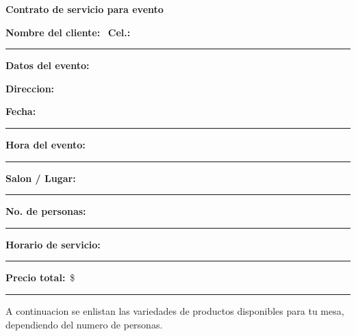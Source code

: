 \documentclass[letterpaper,11pt]{article}
\newcommand{\linefield}[1]{\textbf{#1}\ \hrulefill}
\begin{document}
\begin{center}
    {\Large \textbf{Contrato de servicio para evento}}
\end{center}

\vspace{0.4cm}

\linefield{Nombre del cliente:}\hspace{0.5cm}
\textbf{Cel.:}\ \rule{4cm}{0.4pt}

\vspace{0.3cm}

\linefield{Datos del evento:}

\vspace{0.3cm}

\linefield{Direccion:}

\vspace{0.3cm}

\textbf{Fecha:}\ \rule{4.6cm}{0.4pt}
\hspace{0.5cm}
\textbf{Hora del evento:}\ \rule{4.4cm}{0.4pt}

\vspace{0.3cm}

\textbf{Salon / Lugar:}\ \rule{10.8cm}{0.4pt}

\vspace{0.3cm}

\textbf{No. de personas:}\ \rule{4.2cm}{0.4pt}
\hspace{0.4cm}
\textbf{Horario de servicio:}\ \rule{4cm}{0.4pt}

\vspace{0.3cm}

\textbf{Precio total:}\ \$\rule{4cm}{0.4pt}

\vspace{0.45cm}

\begin{center}
\small
A continuacion se enlistan las variedades de productos disponibles para tu mesa,\\
dependiendo del numero de personas.
\end{center}

\vspace{0.25cm}
\end{document}

